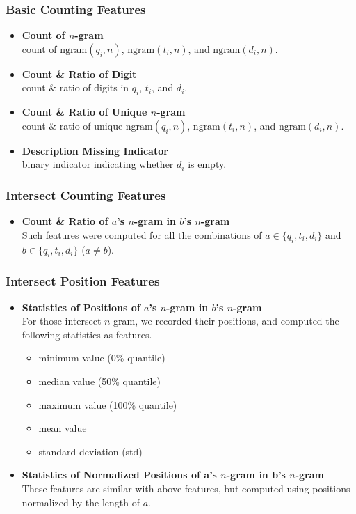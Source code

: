 \documentclass[12pt]{article}
\begin{document}
\subsubsection{Basic Counting Features}
\begin{itemize}
\item \textbf{Count of $n$-gram}\\
count of $\text{ngram}(q_i, n)$, $\text{ngram}(t_i, n)$, and $\text{ngram}(d_i, n)$.
\item \textbf{Count \& Ratio of Digit}\\
count \& ratio of digits in $q_i$, $t_i$, and $d_i$.
\item \textbf{Count \& Ratio of Unique $n$-gram}\\
count \& ratio of unique $\text{ngram}(q_i, n)$, $\text{ngram}(t_i, n)$, and $\text{ngram}(d_i, n)$.
\item \textbf{Description Missing Indicator}\\
binary indicator indicating whether $d_i$ is empty.
\end{itemize}

\subsubsection{Intersect Counting Features}
\begin{itemize}
\item \textbf{Count \& Ratio of $a$'s $n$-gram in $b$'s $n$-gram}\\
Such features were computed for all the combinations of $a\in\{q_i, t_i, d_i\}$ and $b\in\{q_i, t_i, d_i\}$ ($a\neq b$).
\end{itemize}

\subsubsection{Intersect Position Features}
\begin{itemize}
\item \textbf{Statistics of Positions of $a$'s $n$-gram in $b$'s $n$-gram}\\
For those intersect $n$-gram, we recorded their positions, and computed the following statistics as features.
\begin{itemize}
        \item minimum value (0\% quantile)
        \item median value (50\% quantile)
        \item maximum value (100\% quantile)
        \item mean value
        \item standard deviation (std)
\end{itemize}
\item \textbf{Statistics of Normalized Positions of a's $n$-gram in b's $n$-gram}\\
These features are similar with above features, but computed using positions normalized by the length of $a$.
\end{itemize}
\end{document}
